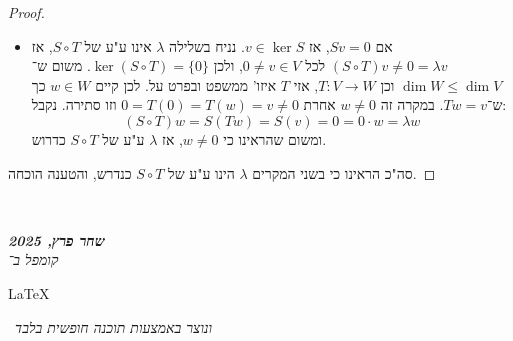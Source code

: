 \documentclass[]{article}
\newcommand\en[1] {\begin{otherlanguage}{english}#1\end{otherlanguage}}
\newcommand\ndoc  {\dotfill \\ \vfil {\begin{center}
			{\textbf{\textit{שחר פרץ, 2025}} \\
				\scriptsize \textit{קומפל ב־}\en{\LaTeX}\,\textit{ ונוצר באמצעות תוכנה חופשית בלבד}}
			\end{center}} \vfil	}
\newcommand\co        {\colon}
\renewcommand\lg      {\lambda}
\theoremstyle{definition}
\begin{document}
\begin{enumerate}
\begin{proof}
\begin{itemize}
				\item אם $Sv = 0$, אז $v \in \ker S$. נניח בשלילה $\lg$ אינו ע"ע של $S \circ T$, אז $(S \circ T)v \neq 0 = \lg v$ לכל $0 \neq v \in V$, ולכן $\ker (S \circ T) = \{0\}$. משום ש־$\dim W \le \dim V$ וכן $T \co V \to W$, אזי $T$ איזו' ממשפט ובפרט על. לכן קיים $w \in W$ כך ש־$Tw = v$. במקרה זה $w \neq 0$ אחרת $0 = T(0) = T(w) = v \neq 0$ וזו סתירה. נקבל: 
				\[ (S \circ T)w = S(Tw) = S(v) = 0 = 0 \cdot w = \lg w \]
				ומשום שהראינו כי $w \neq 0$, אז $\lg$ ע"ע של $S \circ T$ כדרוש. 
			\end{itemize}
			סה"כ הראינו כי בשני המקרים $\lg$ הינו ע"ע של $S \circ T$ כנדרש, והטענה הוכחה. 
		\end{proof}
	\end{enumerate}
	
	\ndoc
	
	
	
\end{document}
